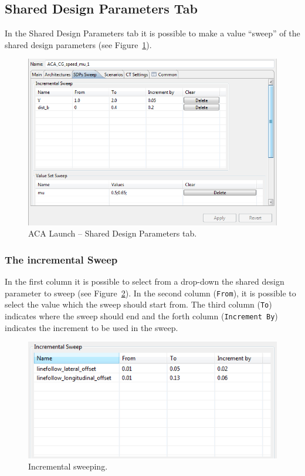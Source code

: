 \documentclass{crescendorepchap}
\begin{document}
\subsection{Shared Design Parameters Tab}

In the Shared Design Parameters tab it is possible to make a value
``sweep'' of the shared design parameters (see Figure~\ref{fig:SDPsSweep}).

\begin{figure}[htbp]
\centering
\includegraphics[width=.6\textwidth]{images/SDPsSweep.png}
\caption{ACA Launch -- Shared Design Parameters tab.\label{fig:SDPsSweep}}
\end{figure}

\subsubsection{The incremental Sweep}

In the first column it is possible to select from a drop-down the shared
design parameter to sweep (see Figure~\ref{fig:IncrementalSweep}). 
In the second column (\texttt{From}), it is possible
to select the value which the sweep should start from. The third column
(\texttt{To}) indicates where the sweep should end and the forth column
(\texttt{Increment By}) indicates the increment to be used in the sweep.

\begin{figure}[htbp]
\centering
\includegraphics[width=.6\textwidth]{images/IncrementalSweep.png}
\caption{Incremental sweeping.\label{fig:IncrementalSweep}}
\end{figure}
\end{document}
